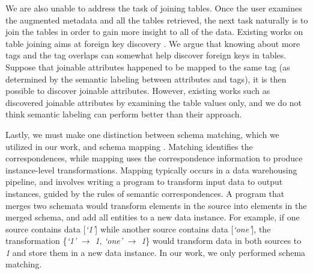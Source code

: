 We are also unable to address the task of joining tables. Once the user examines the augmented metadata and all the tables retrieved, the next task naturally is to join the tables in order to gain more insight to all of the data. Existing works on table joining aims at foreign key discovery \cite{Song2018GeoFlux}. We argue that knowing about more tags and the tag overlaps can somewhat help discover foreign keys in tables. Suppose that joinable attributes happened to be mapped to the same tag (as determined by the semantic labeling between attributes and tags), it is then possible to discover joinable attributes. However, existing works such as \cite{10.1145/3299869.3300065,10.14778/2994509.2994534} discovered joinable attributes by examining the table values only, and we do not think semantic labeling can perform better than their approach.

Lastly, we must make one distinction between schema matching, which we utilized in our work, and schema mapping \cite{Zhang2018Managing}. Matching identifies the correspondences, while mapping uses the correspondence information to produce instance-level transformations. Mapping typically occurs in a data warehousing pipeline, and involves writing a program to transform input data to output instances, guided by the rules of semantic correspondences. A program that merges two schemata would transform elements in the source into elements in the merged schema, and add all entities to a new data instance. For example, if one source contains data [\textit{`1'}] while another source contains data [\textit{`one'}], the transformation \{\textit{`1'} $\rightarrow$ \textit{1}, \textit{`one'} $\rightarrow$ \textit{1}\} would transform data in both sources to \textit{1} and store them in a new data instance. In our work, we only performed schema matching.
\endinput